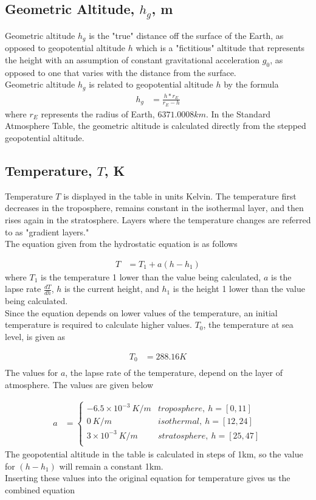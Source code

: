 \documentclass{article}
\begin{document}
\subsection{Geometric Altitude, $h_g$, m}
Geometric altitude $h_g$ is the "true" distance off the surface of the Earth, as opposed to geopotential altitude $h$ which is a "fictitious" altitude that represents the height with an assumption of constant gravitational acceleration $g_0$, as opposed to one that varies with the distance from the surface.\\
Geometric altitude $h_g$ is related to geopotential altitude $h$ by the formula 
\begin{align}
    h_g &= \frac{h * r_E}{r_E - h}
\end{align}
where $r_E$ represents the radius of Earth, $6371.0008 km$. In the Standard Atmosphere Table, the geometric altitude is calculated directly from the stepped geopotential altitude.

\subsection{Temperature, $T$, K}
Temperature $T$ is displayed in the table in units Kelvin. The temperature first decreases in the troposphere, remains constant in the isothermal layer, and then rises again in the stratosphere. Layers where the temperature changes are referred to as "gradient layers." \\
The equation given from the hydrostatic equation is as follows

\begin{align*}
    T &= T_1 + a(h - h_1)
\end{align*}
where $T_1$ is the temperature 1 lower than the value being calculated, $a$ is the lapse rate $\frac{dT}{dh}$, $h$ is the current height, and $h_1$ is the height 1 lower than the value being calculated. \\ 
Since the equation depends on lower values of the temperature, an initial temperature is required to calculate higher values. $T_0$, the temperature at sea level, is given as 

\begin{align*}
    T_{0} &= 288.16 K \\
\end{align*}
The values for $a$, the lapse rate of the temperature, depend on the layer of atmosphere. The values are given below

\begin{align*}
    a &= \begin{cases}
    -6.5\times10^{-3}\  K/m   & troposphere,\ h = [0,11] \\
    0 \ K/m                  & isothermal,\ h = [12,24] \\
    3\times10^{-3}\ K/m     & stratosphere,\ h = [25,47] \\
    \end{cases}
\end{align*}
The geopotential altitude in the table is calculated in steps of 1km, so the value for $(h-h_1)$ will remain a constant 1km.\\
Inserting these values into the original equation for temperature gives us the combined equation
\end{document}
